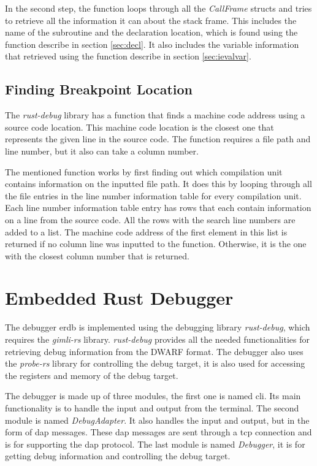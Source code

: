 In the second step, the function loops through all the \emph{CallFrame} structs and tries to retrieve all the information it can about the stack frame.
This includes the name of the subroutine and the declaration location, which is found using the function describe in section \ref{sec:decl}.
It also includes the variable information that retrieved using the function describe in section \ref{sec:ievalvar}.



\subsection{Finding Breakpoint Location}
The \emph{rust-debug} library has a function that finds a machine code address using a source code location.
This machine code location is the closest one that represents the given line in the source code.
The function requires a file path and line number, but it also can take a column number.


The mentioned function works by first finding out which compilation unit contains information on the inputted file path.
It does this by looping through all the file entries in the line number information table for every compilation unit.
Each line number information table entry has rows that each contain information on a line from the source code.
All the rows with the search line numbers are added to a list.
The machine code address of the first element in this list is returned if no column line was inputted to the function.
Otherwise, it is the one with the closest column number that is returned.




\section{Embedded Rust Debugger}
The debugger \acrfull{erdb} is implemented using the debugging library \emph{rust-debug}, which requires the \emph{gimli-rs} library.
\emph{rust-debug} provides all the needed functionalities for retrieving debug information from the \gls{DWARF} format.
The debugger also uses the \emph{probe-rs} library for controlling the debug target, it is also used for accessing the registers and memory of the debug target.


The debugger is made up of three modules, the first one is named \acrshort{cli}.
Its main functionality is to handle the input and output from the terminal.
The second module is named \emph{DebugAdapter}.
It also handles the input and output, but in the form of \gls{dap} messages.
These \gls{dap} messages are sent through a \acrshort{tcp} connection and is for supporting the \gls{dap} protocol.
The last module is named \emph{Debugger}, it is for getting debug information and controlling the debug target.




